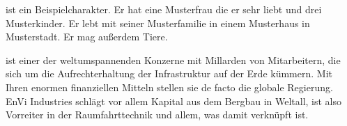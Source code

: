 
{%
  ist ein Beispielcharakter. Er hat eine Musterfrau die er sehr liebt und drei Musterkinder.
  Er lebt mit seiner Musterfamilie in einem Musterhaus in Musterstadt. Er mag außerdem Tiere.
}

{%
  ist einer der weltumspannenden Konzerne mit Millarden von Mitarbeitern, die sich um die
  Aufrechterhaltung der Infrastruktur auf der Erde kümmern. Mit Ihren enormen finanziellen Mitteln
  stellen sie de facto die globale Regierung. EnVi Industries schlägt vor allem Kapital aus dem
  Bergbau in Weltall, ist also Vorreiter in der Raumfahrttechnik und allem, was damit verknüpft ist.
}
